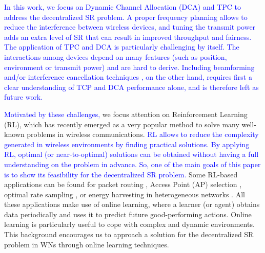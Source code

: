 \documentclass[preprint,12pt]{elsarticle}
\begin{document}
	\textcolor{blue}{In this work, we focus on Dynamic Channel Allocation (DCA) and TPC to address the decentralized SR problem. A proper frequency planning allows to reduce the interference between wireless devices, and tuning the transmit power adds an extra level of SR that can result in improved throughput and fairness. The application of TPC and DCA is particularly challenging by itself. The interactions among devices depend on many features (such as position, environment or transmit power) and are hard to derive. %
		Including beamforming and/or interference cancellation techniques \cite{dovelos2018breaking}, on the other hand, requires first a clear understanding of TCP and DCA performance alone, and is therefore left as future work.}
	
	\textcolor{blue}{Motivated by these challenges,} we focus attention on Reinforcement Learning (RL), which has recently emerged as a very popular method to solve many well-known problems in wireless communications. \textcolor{blue}{RL allows to reduce the complexity generated in wireless environments by finding practical solutions. By applying RL, optimal (or near-to-optimal) solutions can be obtained without having a full understanding on the problem in advance. So, one of the main goals of this paper is to show its feasibility for the decentralized SR problem.} Some RL-based applications can be found for packet routing \cite{littman1993distributed}, Access Point (AP) selection \cite{bojovic2011supervised, bojovic2012neural}, optimal rate sampling \cite{combes2014optimal}, or energy harvesting in heterogeneous networks \cite{miozzo2015distributed}. All these applications make use of online learning, where a learner (or agent) obtains data periodically and uses it to predict future good-performing actions. Online learning is particularly useful to cope with complex and dynamic environments. This background encourages us to approach a solution for the decentralized SR problem in WNs through online learning techniques.
	
\end{document}
